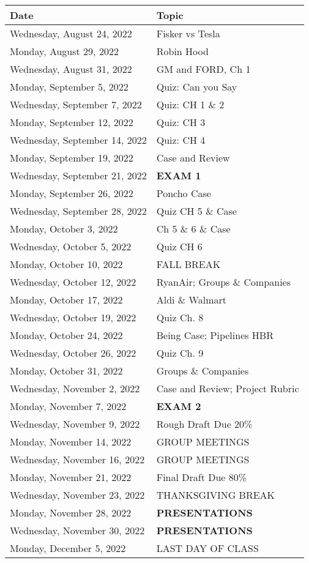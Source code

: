 \documentclass[
]{book}
\begin{document}
\begin{longtable}[]{@{}ll@{}}
\toprule
Date & Topic \\
\midrule
\endhead
Wednesday, August 24, 2022 & Fisker vs Tesla \\
Monday, August 29, 2022 & Robin Hood \\
Wednesday, August 31, 2022 & GM and FORD, Ch 1 \\
Monday, September 5, 2022 & Quiz: Can you Say \\
Wednesday, September 7, 2022 & Quiz: CH 1 \& 2 \\
Monday, September 12, 2022 & Quiz: CH 3 \\
Wednesday, September 14, 2022 & Quiz: CH 4 \\
Monday, September 19, 2022 & Case and Review \\
Wednesday, September 21, 2022 & \textbf{EXAM 1} \\
Monday, September 26, 2022 & Poncho Case \\
Wednesday, September 28, 2022 & Quiz CH 5 \& Case \\
Monday, October 3, 2022 & Ch 5 \& 6 \& Case \\
Wednesday, October 5, 2022 & Quiz CH 6 \\
Monday, October 10, 2022 & FALL BREAK \\
Wednesday, October 12, 2022 & RyanAir; Groups \& Companies \\
Monday, October 17, 2022 & Aldi \& Walmart \\
Wednesday, October 19, 2022 & Quiz Ch. 8 \\
Monday, October 24, 2022 & Being Case; Pipelines HBR \\
Wednesday, October 26, 2022 & Quiz Ch. 9 \\
Monday, October 31, 2022 & Groups \& Companies \\
Wednesday, November 2, 2022 & Case and Review; Project Rubric \\
Monday, November 7, 2022 & \textbf{EXAM 2} \\
Wednesday, November 9, 2022 & Rough Draft Due 20\% \\
Monday, November 14, 2022 & GROUP MEETINGS \\
Wednesday, November 16, 2022 & GROUP MEETINGS \\
Monday, November 21, 2022 & Final Draft Due 80\% \\
Wednesday, November 23, 2022 & THANKSGIVING BREAK \\
Monday, November 28, 2022 & \textbf{PRESENTATIONS} \\
Wednesday, November 30, 2022 & \textbf{PRESENTATIONS} \\
Monday, December 5, 2022 & LAST DAY OF CLASS \\
\bottomrule
\end{longtable}
\end{document}
